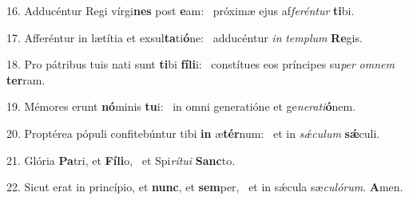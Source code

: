 16. Adducéntur Regi vírgi\textbf{nes} post \textbf{e}am: \ast\  próximæ ejus af\textit{fe}\textit{rén}\textit{tur} \textbf{ti}bi.\

17. Afferéntur in lætítia et exsul\textbf{ta}ti\textbf{ó}ne: \ast\  adducéntur \textit{in} \textit{tem}\textit{plum} \textbf{Re}gis.\

18. Pro pátribus tuis nati sunt \textbf{ti}bi \textbf{fí}\textbf{li}i: \ast\  constítues eos príncipes su\textit{per} \textit{om}\textit{nem} \textbf{ter}ram.\

19. Mémores erunt \textbf{nó}minis \textbf{tu}i: \ast\  in omni generatióne et ge\textit{ne}\textit{ra}\textit{ti}\textbf{ó}nem.\

20. Proptérea pópuli confitebúntur tibi \textbf{in} æ\textbf{tér}num: \ast\  et in \textit{sǽ}\textit{cu}\textit{lum} \textbf{sǽ}culi.\

21. Glória \textbf{Pa}tri, et \textbf{Fí}\textbf{li}o, \ast\  et Spi\textit{rí}\textit{tu}\textit{i} \textbf{Sanc}to.\

22. Sicut erat in princípio, et \textbf{nunc}, et \textbf{sem}per, \ast\  et in sǽcula sæ\textit{cu}\textit{ló}\textit{rum}. \textbf{A}men.\

